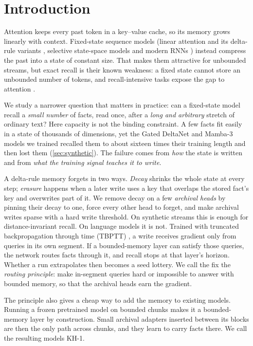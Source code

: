 \documentclass[11pt]{article}
\newcommand{\KH}{KH-1}
\begin{document}
\section{Introduction}
\label{sec:intro}
Attention keeps every past token in a key--value cache, so its memory grows linearly with context. Fixed-state sequence models (linear attention and its delta-rule variants \citep{schlag2021,deltanet2024,gdn2024}, selective state-space models \citep{mamba2023,mamba2_2024,mamba3_2025} and modern RNNs \citep{rwkv7_2025}) instead compress the past into a state of constant size. That makes them attractive for unbounded streams, but exact recall is their known weakness: a fixed state cannot store an unbounded number of tokens, and recall-intensive tasks expose the gap to attention \citep{jelassi2024,zoology2023,based2024}.

We study a narrower question that matters in practice: can a fixed-state model recall a \emph{small number} of facts, read once, after a \emph{long and arbitrary} stretch of ordinary text? Here capacity is not the binding constraint. A few facts fit easily in a state of thousands of dimensions, yet the Gated DeltaNet and Mamba-3 models we trained recalled them to about sixteen times their training length and then lost them (\cref{sec:synthetic}). The failure comes from \emph{how} the state is written and from \emph{what the training signal teaches it to write}.

A delta-rule memory forgets in two ways. \emph{Decay} shrinks the whole state at every step; \emph{erasure} happens when a later write uses a key that overlaps the stored fact's key and overwrites part of it. We remove decay on a few \emph{archival heads} by pinning their decay to one, force every other head to forget, and make archival writes sparse with a hard write threshold. On synthetic streams this is enough for distance-invariant recall. On language models it is not. Trained with truncated backpropagation through time (TBPTT) \citep{tbptt1990}, a write receives gradient only from queries in its own segment. If a bounded-memory layer can satisfy those queries, the network routes facts through it, and recall stops at that layer's horizon. Whether a run extrapolates then becomes a seed lottery. We call the fix the \emph{routing principle}: make in-segment queries hard or impossible to answer with bounded memory, so that the archival heads earn the gradient.

The principle also gives a cheap way to add the memory to existing models. Running a frozen pretrained model on bounded chunks makes it a bounded-memory layer by construction. Small archival adapters inserted between its blocks are then the only path across chunks, and they learn to carry facts there. We call the resulting models \KH{}.
\end{document}
